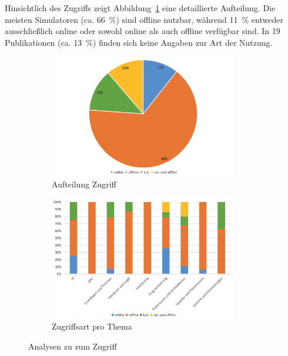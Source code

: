Hinsichtlich des Zugriffs zeigt Abbildung~\ref{fig:11-zugriff} eine detaillierte Aufteilung. Die meisten Simulatoren (ca. 66~\%) sind offline nutzbar, während 11~\% entweder ausschließlich online oder sowohl online als auch offline verfügbar sind. In 19 Publikationen (ca. 13~\%) finden sich keine Angaben zur Art der Nutzung.

\begin{figure}[!htbp]
    \centering
    \begin{subfigure}[b]{0.48\textwidth}
        \centering
        \includegraphics[width=0.90\textwidth]{graphics_lit/11-zugriff.png}
        \caption{Aufteilung Zugriff}
        \label{fig:11-zugriff}
    \end{subfigure}
    \hfill
    \begin{subfigure}[b]{0.48\textwidth}
        \centering
        \includegraphics[width=0.90\textwidth]{graphics_lit/13-zugriff-thema.png}
        \caption{Zugriffsart pro Thema}
        \label{fig:13-zugriff-thema}
    \end{subfigure}
    \caption{Analysen zu zum Zugriff}
    \label{fig:zugriff-analysen}
\end{figure}


